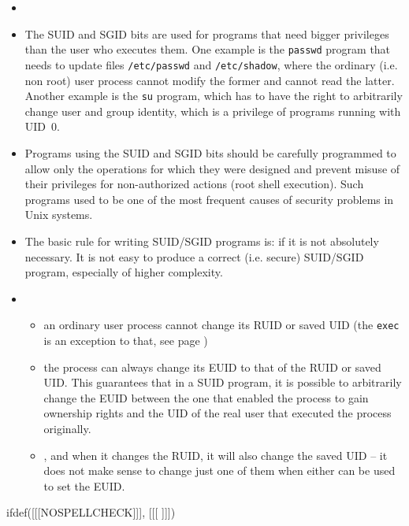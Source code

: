 \begin{itemize}
\item {}
\item {} The SUID and SGID bits are used for programs that need
bigger privileges than the user who executes them. One example is the
\texttt{passwd} program that needs to update files \texttt{/etc/passwd} and
\texttt{/etc/shadow}, where the ordinary (i.e. non root) user process cannot
modify the former and cannot read the latter. Another example is the
\texttt{su} program, which has to have the right to arbitrarily change user and
group identity, which is a privilege of programs running with UID~0.
\item Programs using the SUID and SGID bits should be carefully programmed
to allow only the operations for which they were designed and prevent misuse
of their privileges for non-authorized actions (root shell execution).
Such programs used to be one of the most frequent causes of security problems
in Unix systems.
\item The basic rule for writing SUID/SGID programs is:  if it is not absolutely necessary.  It is not easy to produce a correct
(i.e. secure) SUID/SGID program, especially of higher complexity.
\item {}
\begin{itemize}
\item an ordinary user process cannot change its RUID or saved UID (the
\texttt{exec} is an exception to that, see page \pageref{EXEC})
\item the process can always change its EUID to that of the RUID or saved UID.
This guarantees that in a SUID program, it is possible to arbitrarily change the EUID
between the one that enabled the process to gain ownership rights and the
UID of the real user that executed the process originally.
\item {}, and when it changes the RUID, it will also
change the saved UID -- it does not make sense to change just one of them when
either can be used to set the EUID.
\end{itemize}
\end{itemize}


ifdef([[[NOSPELLCHECK]]], [[[
]]])

